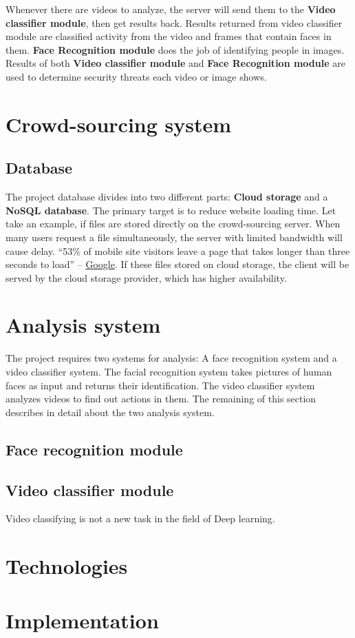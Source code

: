 Whenever there are videos to analyze, the server will send them to the \textbf{Video classifier module}, then get results back. Results returned from video classifier module are classified activity from the video and frames that contain faces in them. \textbf{Face Recognition module} does the job of identifying people in images. Results of both \textbf{Video classifier module} and \textbf{Face Recognition module} are used to determine security threats each video or image shows.
\section{Crowd-sourcing system}
\subsection{Database}
The project database divides into two different parts: \textbf{Cloud storage} and a \textbf{NoSQL database}. The primary target is to reduce website loading time. Let take an example, if files are stored directly on the crowd-sourcing server. When many users request a file simultaneously, the server with limited bandwidth will cause delay. “53\% of mobile site visitors leave a page that takes longer than three seconds to load” – \href{https://think.storage.googleapis.com/docs/mobile-page-speed-new-industry-benchmarks.pdf}{Google}. If these files stored on cloud storage, the client will be served by the cloud storage provider, which has higher availability.
\section{Analysis system}
The project requires two systems for analysis: A face recognition system and a video classifier system. The facial recognition system takes pictures of human faces as input and returns their identification. The video classifier system analyzes videos to find out actions in them. The remaining of this section describes in detail about the two analysis system.
\subsection{Face recognition module}
\subsection{Video classifier module}
Video classifying is not a new task in the field of Deep learning.
	
\section{Technologies}
\section{Implementation}
